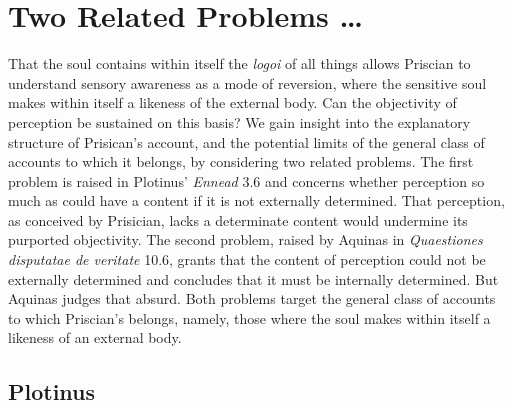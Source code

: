 \documentclass[12pt]{article}
\begin{document}


\section{Two Related Problems \ldots} %
\label{sec:some_related_problems_ldots}

That the soul contains within itself the \emph{logoi} of all things allows Priscian to understand sensory awareness as a mode of reversion, where the sensitive soul makes within itself a likeness of the external body. Can the objectivity of perception be sustained on this basis? We gain insight into the explanatory structure of Prisican's account, and the potential limits of the general class of accounts to which it belongs, by considering two related problems. The first problem is raised in Plotinus' \emph{Ennead} 3.6 and concerns whether perception so much as could have a content if it is not externally determined. That perception, as conceived by Prisician, lacks a determinate content would undermine its purported objectivity. The second problem, raised by Aquinas in \emph{Quaestiones disputatae de veritate} 10.6, grants that the content of perception could not be externally determined and concludes that it must be internally determined. But Aquinas judges that absurd. Both problems target the general class of accounts to which Priscian's belongs, namely, those where the soul makes within itself a likeness of an external body.

\subsection{Plotinus} %
\label{sub:plotinus}
\end{document}
